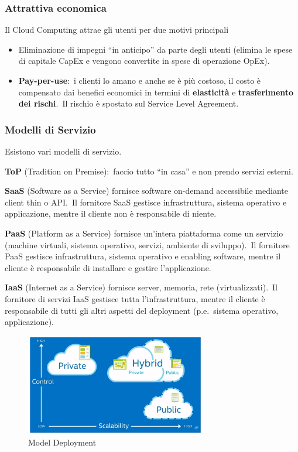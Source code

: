 \subsubsection{Attrattiva economica}
Il Cloud Computing attrae gli utenti per due motivi principali
\begin{itemize}
    \item Eliminazione di impegni ``in anticipo'' da parte degli utenti (elimina le spese di capitale CapEx e vengono convertite in spese di operazione OpEx).
    \item \textbf{Pay-per-use}:\ i clienti lo amano e anche se è più costoso, il costo è compensato dai benefici economici in termini di \textbf{elasticità} e \textbf{trasferimento dei rischi}.\ Il rischio è spostato sul Service Level Agreement.
\end{itemize}

\subsubsection{Modelli di Servizio}
Esistono vari modelli di servizio.

\textbf{ToP} (Tradition on Premise):\ faccio tutto ``in casa'' e non prendo servizi esterni.\

\textbf{SaaS} (Software as a Service) fornisce software on-demand accessibile mediante client thin o API.\
Il fornitore SaaS gestisce infrastruttura, sistema operativo e applicazione, mentre il cliente non è responsabile di niente.

\textbf{PaaS} (Platform as a Service) fornisce un'intera piattaforma come un servizio (machine virtuali, sistema operativo, servizi, ambiente di sviluppo).\
Il fornitore PaaS gestisce infrastruttura, sistema operativo e enabling software, mentre il cliente è responsabile di installare e gestire l'applicazione.\

\textbf{IaaS} (Internet as a Service) fornisce server, memoria, rete (virtualizzati).\
Il fornitore di servizi IaaS gestisce tutta l'infrastruttura, mentre il cliente è responsabile di tutti gli altri aspetti del deployment (p.e.\ sistema operativo, applicazione).

\begin{figure}[H]
    \centering
    \includegraphics[width=0.7\textwidth]{immagini/Model_Deployment.jpg}
    \caption*{Model Deployment}
\end{figure}

